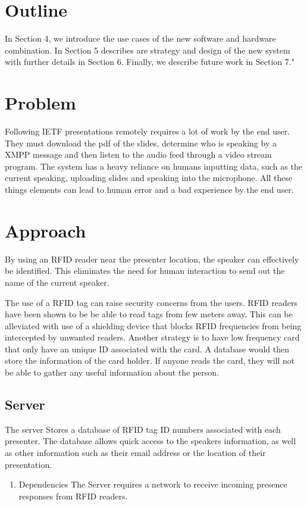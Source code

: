 \documentclass{article}
\begin{document}
\section{Outline}
	  In Section 4, we introduce the use cases of the new software and hardware combination. In Section 5 describes are strategy and design of the new system with further details in Section 6. Finally, we describe future work in Section 7."
\section{Problem}

Following IETF presentations remotely requires a lot of work by the end user. They must download the pdf of the slides, determine who is speaking by a XMPP message and then listen to the audio feed through a video stream program. The system has a heavy reliance on humans inputting data, such as the current speaking, uploading slides and speaking into the microphone. All these things elements can lead to human error and a bad experience by the end user.

\section{Approach}
	By using an RFID reader near the presenter location, the speaker can effectively be identified. This eliminates the need for human interaction to send out the name of the 
	current speaker. 
	
	The use of a RFID tag can raise security concerns from the users. RFID readers have been shown to be be able to read tags from few meters away.
	This can be alleviated with use of a shielding device that blocks RFID frequencies from being intercepted by unwanted readers. Another strategy is to 
	have low frequency card that only have an unique ID associated with the card. A database would then store the information of the card holder.
	 If anyone reads the card, they will not be able to gather any useful information about the person.
	 
	\subsection{Server}
	The server Stores a database of RFID tag ID numbers associated with each presenter. The database allows quick access to the speakers information, as well as other
	information such as their email address or the location of their presentation.
	\begin{enumerate}
		
		\item	Dependencies
		The Server requires a network to receive incoming presence responses from RFID readers.
	\end{enumerate}
	
\end{document}
